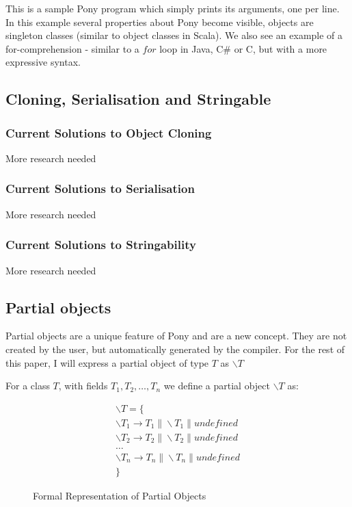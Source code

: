 \documentclass{article}
\begin{document}
This is a sample Pony program which simply prints its arguments, one per line.
In this example several properties about  Pony become visible, objects are
singleton classes (similar to object classes in Scala). We also see an example
of a for-comprehension - similar to a $for$ loop in Java, C\# or C, but with a
more expressive syntax.

\subsection{Cloning, Serialisation and Stringable}

\subsubsection{Current Solutions to Object Cloning}

More research needed

\subsubsection{Current Solutions to Serialisation}

More research needed

\subsubsection{Current Solutions to Stringability}

More research needed

\subsection{Partial objects}

Partial objects are a unique feature of Pony and are a new concept. They are not
created by the user, but automatically generated by the compiler. For the rest
of this paper, I will express a partial object of type $T$
as $\backslash T$

For a class $T$, with fields $T_{1}, T_{2}, \dots , T_{n}$ we define a partial
object $\backslash T$ as:

\begin{figure}[H]
\begin{align*}
\backslash T  = \{\\
	\backslash T_{1} \to T_{1} \| \backslash T_{1} \| undefined\\
	\backslash T_{2} \to T_{2} \| \backslash T_{2} \| undefined\\
	\dots\\
	\backslash T_{n} \to T_{n} \| \backslash T_{n} \| undefined\\
\}
\end{align*}
\caption{Formal Representation of Partial Objects}
\end{figure}
\end{document}
